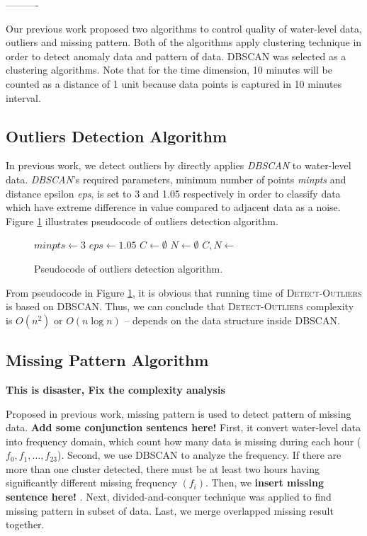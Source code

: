\documentclass[conference]{IEEEtran}
\begin{document}
----------

Our previous work proposed two algorithms to control quality of water-level data, outliers and missing pattern. Both of the algorithms apply clustering technique in order to detect anomaly data and pattern of data. DBSCAN was selected as a clustering algorithms. Note that for the time dimension, 10 minutes will be counted as a distance of 1 unit because data points is captured in 10 minutes interval.

\subsection{Outliers Detection Algorithm}
In previous work, we detect outliers by directly applies \textit{DBSCAN} to water-level data. \textit{DBSCAN}'s required parameters, minimum number of points \textit{minpts} and distance epsilon \textit{eps}, is set to 3 and 1.05 respectively in order to classify data which have extreme difference in value compared to adjacent data as a noise. Figure \ref{fig:outliers_pseudocode} illustrates pseudocode of outliers detection algorithm.

\begin{figure}[H]
\begin{algorithmic}[1]
\State $minpts\gets3$
\State $eps\gets1.05 $
\State $C\gets\emptyset$
\State $N\gets\emptyset$
\State $C, N \gets $
\State {}
\EndProcedure
\end{algorithmic}
\caption{Pseudocode of outliers detection algorithm.}
\label{fig:outliers_pseudocode}
\end{figure}

From pseudocode in Figure \ref{fig:outliers_pseudocode}, it is obvious that running time of \textsc{Detect-Outliers} is based on \textsc{DBSCAN}. Thus, we can conclude that \textsc{Detect-Outliers} complexity is $O(n^2)$ or $O(n\log{n})$ -- depends on the data structure inside \textsc{DBSCAN}.

\subsection{Missing Pattern Algorithm}

\textbf{\color{red} This is disaster, Fix the complexity analysis}

Proposed in previous work, missing pattern is used to detect pattern of missing data. \textbf{\color{red}Add some conjunction sentencs here!} First, it convert water-level data into frequency domain, which count how many data is missing during each hour ($f_{0} ,f_{1}, \ldots, f_{23}$). Second, we use DBSCAN to analyze the frequency. If there are more than one cluster detected, there must be at least two hours having significantly different missing frequency $(f_{i})$. Then, we \textbf{\color{red} insert missing sentence here!} . Next, divided-and-conquer technique was applied to find missing pattern in subset of data. Last, we merge overlapped missing result together.
\end{document}
